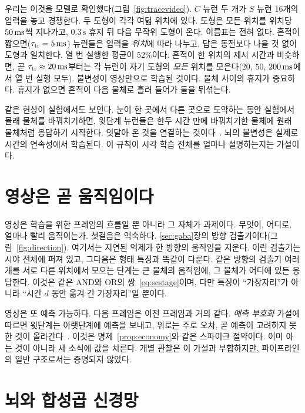 우리는 이것을 모델로 확인했다(그림~\ref{fig:tracevideo}). $C$ 뉴런 두 개가 $S$ 뉴런 $16$개의 입력을 놓고 경쟁한다. 두 도형이 각각 여덟 위치에 있다. 도형은 모든 위치를 위치당 $50\,\text{ms}$씩 지나가고, $0.3\,\text{s}$ 휴지 뒤 다음 무작위 도형이 온다. 이름표는 전혀 없다. 흔적이 짧으면($\tau_{\text{tr}}=5\,\text{ms}$) 뉴런들은 입력을 \emph{위치}에 따라 나누고, 답은 동전보다 나을 것 없이 도형과 일치한다. 열 번 실행한 평균이 $52\%$이다. 흔적이 한 위치의 제시 시간과 비슷하면, 곧 $\tau_{\text{tr}}\approx20\,\text{ms}$부터는 각 뉴런이 자기 도형의 \emph{모든} 위치를 모은다($20$, $50$, $200\,\text{ms}$에서 열 번 실행 모두). 불변성이 영상만으로 학습된 것이다. 물체 사이의 휴지가 중요하다. 휴지가 없으면 흔적이 다음 물체로 흘러 들어가 둘을 뒤섞는다.

같은 현상이 실험에서도 보인다. 눈이 한 곳에서 다른 곳으로 도약하는 동안 실험에서 몰래 물체를 바꿔치기하면, 윗단계 뉴런들은 한두 시간 만에 바꿔치기한 물체에 원래 물체처럼 응답하기 시작한다. 잇달아 온 것을 연결하는 것이다~\cite{LiDiCarlo2008}. 뇌의 불변성은 실제로 시간의 연속성에서 학습된다. 이 규칙이 시각 학습 전체를 얼마나 설명하는지는 가설이다.

\section{영상은 곧 움직임이다}

영상은 학습을 위한 프레임의 흐름일 뿐 아니라 그 자체가 과제이다. 무엇이, 어디로, 얼마나 빨리 움직이는가. 첫걸음은 익숙하다. \ref{sec:gaba}장의 방향 검출기이다(그림~\ref{fig:direction}). 여기서는 지연된 억제가 한 방향의 움직임을 지운다. 이런 검출기는 시야 전체에 퍼져 있고, 그다음은 형태 특징과 똑같이 다룬다. 같은 방향의 검출기 여러 개를 서로 다른 위치에서 모으는 단계는 큰 물체의 움직임에, 그 물체가 어디에 있든 응답한다. 이것은 같은 AND와 OR의 쌍~\eqref{eq:scstage}이며, 다만 특징이 “가장자리”가 아니라 “시간 $d$ 동안 옮겨 간 가장자리”일 뿐이다.

영상은 또 예측 가능하다. 다음 프레임은 이전 프레임과 거의 같다. \emph{예측 부호화} 가설에 따르면 윗단계는 아랫단계에 예측을 보내고, 위로는 주로 오차, 곧 예측이 고려하지 못한 것이 올라간다~\cite{RaoBallard1999}. 이것은 명제~\ref{prop:economy}와 같은 스파이크 절약이다. 이미 아는 것이 아니라 새 소식에 값을 치른다. 개별 관찰은 이 가설과 부합하지만, 파이프라인의 일반 구조로서는 증명되지 않았다.

\section{뇌와 합성곱 신경망}

